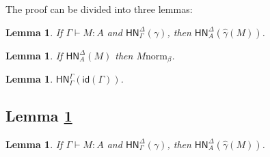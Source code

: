 \documentclass{article}
\newtheorem{lem}[thm]{Lemma}
\newtheorem*{lemm}{Lemma}
\newcommand{\hasEF}[3]{\ensuremath{#1 \vdash #2 : #3}}
\newcommand{\bnorm}[1]{#1 \mathrel{\text{norm}_\beta}}
\newcommand{\hnorm}[3]{\ensuremath{\mathsf{HN}^{#1}_{#2}(#3)}}
\newcommand{\id}[1]{\ensuremath{\mathsf{id}(#1)}}
\begin{document}
The proof can be divided into three lemmas: 
\begin{lem}\label{l1}
If $\hasEF{\Gamma}{M}{A}$ and $\hnorm{\Delta}{\Gamma}{\gamma}$, then $\hnorm{\Delta}{A}{\hat\gamma(M)}$.
\end{lem}

\begin{lem}\label{l2}
If $\hnorm{\Delta}{A}{M}$ then $\bnorm{M}$.
\end{lem}

\begin{lem}\label{l3}
$\hnorm{\Gamma}{\Gamma}{\id{\Gamma}}$.
\end{lem}

\subsection{Lemma \ref{l1}}

\begin{lemm}
If $\hasEF{\Gamma}{M}{A}$ and $\hnorm{\Delta}{\Gamma}{\gamma}$, then $\hnorm{\Delta}{A}{\hat\gamma(M)}$.
\end{lemm}
\end{document}
